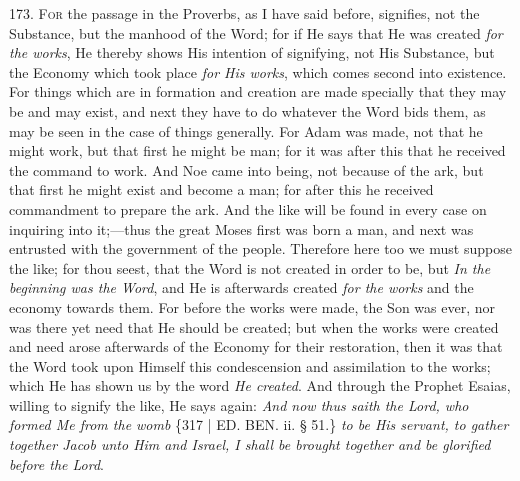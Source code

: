 173. F\textsc{or} the passage in
the Proverbs, as I have said before, signifies, not the Substance, but
the manhood of the Word; for if He says that He was created \emph{for the
works}, He thereby shows His intention of signifying, not His
Substance, but the Economy which took place \emph{for His works},
which comes second into existence. For things which are in formation
and creation are made specially that they may be and may exist, and
next they have to do whatever the Word bids them, as may be seen in
the case of things generally. For Adam was made, not that he might
work, but that first he might be man; for it was after this that he
received the command to work. And Noe came into being, not because of
the ark, but that first he might exist and become a man; for after
this he received commandment to prepare the ark. And the like will be
found in every case on inquiring into it;—thus the great Moses first
was born a man, and next was entrusted with the government of the
people. Therefore here too we must suppose the like; for thou seest,
that the Word is not created in order to be, but \emph{In the beginning
was the Word}, and He is afterwards created \emph{for the works}
and the economy towards them. For before the works were made, the Son
was ever, nor was there yet need that He should be created; but when
the works were created and need arose afterwards of the Economy for
their restoration, then it was that the Word took upon Himself this
condescension and assimilation to the works; which He has shown us by
the word \emph{He created}. And through the Prophet Esaias, willing to
signify the like, He says again: \emph{And now thus saith the Lord, who
formed Me from the womb} \{317 | ED. BEN.
ii. § 51.\} \emph{to be His servant, to gather together Jacob unto Him
and Israel, I shall be brought together and be glorified before the
Lord}.

